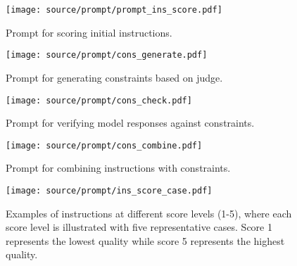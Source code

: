\begin{figure}[h]
\centering
\texttt{[image: source/prompt/prompt\_ins\_score.pdf]}
\caption{Prompt for scoring initial instructions.}
\label{figure:prompt_ins_score}
\end{figure}


\begin{figure}[h]
\centering
\texttt{[image: source/prompt/cons\_generate.pdf]}
\caption{Prompt for generating constraints based on judge.}
\label{figure:cons_generate}
\end{figure}
\begin{figure}[h]
\centering
\texttt{[image: source/prompt/cons\_check.pdf]}
\caption{Prompt for verifying model responses against constraints.}
\label{figure:cons_check}
\end{figure}

\begin{figure}[h]
\centering
\texttt{[image: source/prompt/cons\_combine.pdf]}
\caption{Prompt for combining instructions with constraints.}
\label{figure:cons_combine}
\end{figure}





\begin{figure}[h]
\centering
\texttt{[image: source/prompt/ins\_score\_case.pdf]}
\caption{Examples of instructions at different score levels (1-5), where each score level is illustrated with five representative cases. Score 1 represents the lowest quality while score 5 represents the highest quality.}
\label{figure:ins_score_case_show}
\end{figure}






